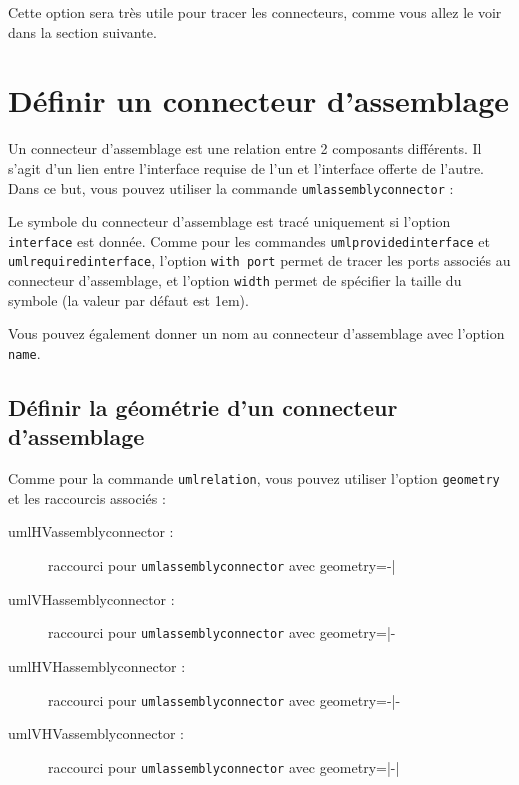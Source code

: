 \documentclass[a4paper,11pt]{report}
\newcommand{\inputTikZ}[1]{%
  }%
\newcommand{\inputTikZ}[1]{%
    \texttt{[image: fig/\#1.pdf]}%
  }%
\begin{document}
\medskip

Cette option sera très utile pour tracer les connecteurs, comme vous allez le voir dans la section suivante.

\section{Définir un connecteur d'assemblage}

Un connecteur d'assemblage est une relation entre 2 composants différents. Il s'agit d'un lien entre l'interface requise de l'un et l'interface offerte de l'autre.
Dans ce but, vous pouvez utiliser la commande {\tt umlassemblyconnector} :

\medskip

\begin{minipage}{0.45\textwidth}

\end{minipage}
\begin{minipage}{0.55\textwidth}
\begin{center}
\inputTikZ{componentassemblyconnector}
\end{center}
\end{minipage}

\medskip

Le symbole du connecteur d'assemblage est tracé uniquement si l'option {\tt interface} est donnée. Comme pour les commandes {\tt umlprovidedinterface} et {\tt umlrequiredinterface}, l'option {\tt  with port} permet de tracer les ports associés au connecteur d'assemblage, et l'option {\tt width} permet de spécifier la taille du symbole (la valeur par défaut est 1em).

Vous pouvez également donner un nom au connecteur d'assemblage avec l'option {\tt name}.

\subsection{Définir la géométrie d'un connecteur d'assemblage}

Comme pour la commande {\tt umlrelation}, vous pouvez utiliser l'option {\tt geometry} et les raccourcis associés :

\begin{description}
\item[umlHVassemblyconnector :] raccourci pour {\tt umlassemblyconnector} avec geometry=-|
\item[umlVHassemblyconnector :] raccourci pour {\tt umlassemblyconnector} avec geometry=|-
\item[umlHVHassemblyconnector :] raccourci pour {\tt umlassemblyconnector} avec geometry=-|-
\item[umlVHVassemblyconnector :] raccourci pour {\tt umlassemblyconnector} avec geometry=|-|
\end{description}
\end{document}
